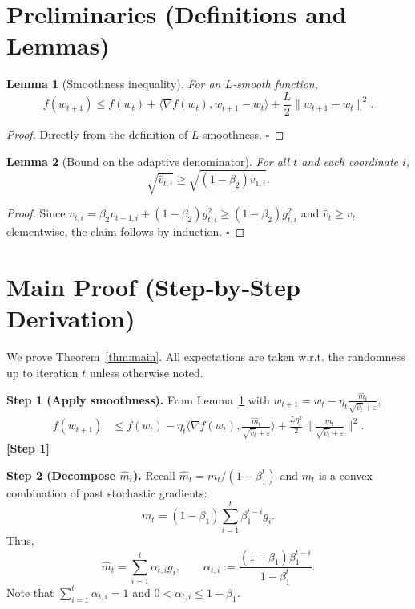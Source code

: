 \documentclass{article}
\newtheorem{lemma}{Lemma}
\begin{document}
\newpage
\section*{Preliminaries (Definitions and Lemmas)}
\begin{lemma}[Smoothness inequality]\label{lem:smooth}
For an $L$‑smooth function,
\[
f(w_{t+1})\le f(w_t)+\langle\nabla f(w_t),w_{t+1}-w_t\rangle+\frac{L}{2}\|w_{t+1}-w_t\|^2 .
\]
\end{lemma}
\begin{proof}
Directly from the definition of $L$‑smoothness. \hfill $\square$
\end{proof}

\begin{lemma}[Bound on the adaptive denominator]\label{lem:denom}
For all $t$ and each coordinate $i$,
\[
\sqrt{\hat v_{t,i}} \ge \sqrt{(1-\beta_2)v_{1,i}}.
\]
\end{lemma}
\begin{proof}
Since $v_{t,i}=\beta_2 v_{t-1,i}+(1-\beta_2)g_{t,i}^2\ge (1-\beta_2)g_{t,i}^2$ and $\hat v_t\ge v_t$ elementwise, the claim follows by induction. \hfill $\square$
\end{proof}

\section*{Main Proof (Step‑by‑Step Derivation)}
We prove Theorem~\ref{thm:main}. All expectations are taken w.r.t. the randomness up to iteration $t$ unless otherwise noted.

\noindent\textbf{Step 1 (Apply smoothness).}  
From Lemma~\ref{lem:smooth} with $w_{t+1}=w_t-\eta_t\frac{\hat m_t}{\sqrt{\hat v_t}+\varepsilon}$,
\begin{align}
f(w_{t+1}) &\le f(w_t)-\eta_t\Big\langle\nabla f(w_t),\frac{\hat m_t}{\sqrt{\hat v_t}+\varepsilon}\Big\rangle
            +\frac{L\eta_t^2}{2}\Big\|\frac{\hat m_t}{\sqrt{\hat v_t}+\varepsilon}\Big\|^2 .
\tag{1}\label{eq:smooth}
\end{align}
\textbf{[Step 1]}

\noindent\textbf{Step 2 (Decompose $\hat m_t$).}  
Recall $\hat m_t=m_t/(1-\beta_1^{t})$ and $m_t$ is a convex combination of past stochastic gradients:
\[
m_t = (1-\beta_1)\sum_{i=1}^{t}\beta_1^{t-i} g_i .
\]
Thus,
\[
\hat m_t = \sum_{i=1}^{t}\alpha_{t,i} g_i,\qquad
\alpha_{t,i}:=\frac{(1-\beta_1)\beta_1^{t-i}}{1-\beta_1^{t}} .
\tag{2}\label{eq:alpha}
\]
Note that $\sum_{i=1}^{t}\alpha_{t,i}=1$ and $0<\alpha_{t,i}\le 1-\beta_1$.
\end{document}

